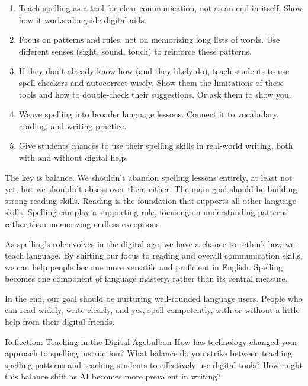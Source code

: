 \begin{enumerate}[noitemsep]
    \item Teach spelling as a tool for clear communication, not as an end in itself. Show how it works alongside digital aids.

    \item Focus on patterns and rules, not on memorizing long lists of words. Use different senses (sight, sound, touch) to reinforce these patterns.

    \item If they don't already know how (and they likely do), teach students to use spell-checkers and autocorrect wisely. Show them the limitations of these tools and how to double-check their suggestions. Or ask them to show you.

    \item Weave spelling into broader language lessons. Connect it to vocabulary, reading, and writing practice.

    \item Give students chances to use their spelling skills in real-world writing, both with and without digital help.
\end{enumerate}

The key is balance. We shouldn't abandon spelling lessons entirely, at least not yet, but we shouldn't obsess over them either. The main goal should be building strong reading skills. Reading is the foundation that supports all other language skills. Spelling can play a supporting role, focusing on understanding patterns rather than memorizing endless exceptions.

As spelling's role evolves in the digital age, we have a chance to rethink how we teach language. By shifting our focus to reading and overall communication skills, we can help people become more versatile and proficient in English. Spelling becomes one component of language mastery, rather than its central measure.

In the end, our goal should be nurturing well-rounded language users. People who can read widely, write clearly, and yes, spell competently, with or without a little help from their digital friends.

\begin{tblsfilledsymbol}{Reflection: Teaching in the Digital Age}{bulbon}
How has technology changed your approach to spelling instruction? What balance do you strike between teaching spelling patterns and teaching students to effectively use digital tools? How might this balance shift as AI becomes more prevalent in writing?
\end{tblsfilledsymbol}

